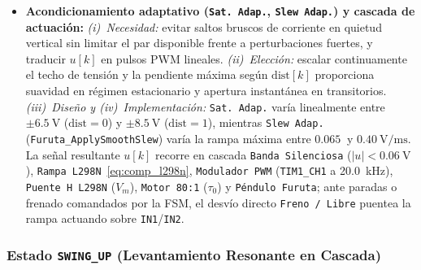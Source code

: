 \begin{itemize}
    \item \textbf{Acondicionamiento adaptativo (\texttt{Sat. Adap.}, \texttt{Slew Adap.}) y cascada de actuación:}
    \textit{(i)~Necesidad:} evitar saltos bruscos de corriente en quietud vertical sin limitar el par disponible frente a perturbaciones fuertes, y traducir $u[k]$ en pulsos PWM lineales.
    \textit{(ii)~Elección:} escalar continuamente el techo de tensión y la pendiente máxima según $\mathrm{dist}[k]$ proporciona suavidad en régimen estacionario y apertura instantánea en transitorios.
    \textit{(iii)~Diseño y (iv)~Implementación:} \texttt{Sat. Adap.} varía linealmente entre $\pm\qty{6.5}{\volt}$ ($\mathrm{dist}=0$) y $\pm\qty{8.5}{\volt}$ ($\mathrm{dist}=1$), mientras \texttt{Slew Adap.} (\texttt{Furuta\_ApplySmoothSlew}) varía la rampa máxima entre $\qty{0.065}{}$ y $\qty{0.40}{\volt\per\milli\second}$. La señal resultante $u[k]$ recorre en cascada \texttt{Banda Silenciosa} ($|u|<\qty{0.06}{\volt}$), \texttt{Rampa L298N}~\eqref{eq:comp_l298n}, \texttt{Modulador PWM} (\texttt{TIM1\_CH1} a \qty{20.0}{\kilo\hertz}), \texttt{Puente H L298N} ($V_m$), \texttt{Motor 80:1} ($\tau_0$) y \texttt{Péndulo Furuta}; ante paradas o frenado comandados por la FSM, el desvío directo \texttt{Freno / Libre} puentea la rampa actuando sobre \texttt{IN1}/\texttt{IN2}.
\end{itemize}

\subsubsection{Estado \texttt{SWING\_UP} (Levantamiento Resonante en Cascada)}




